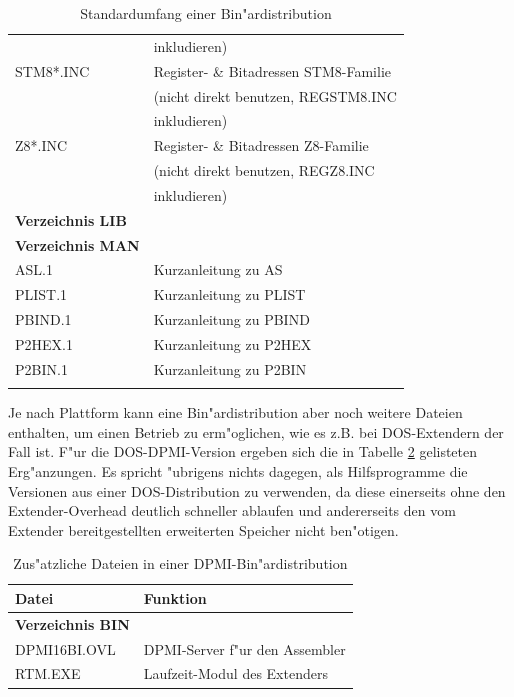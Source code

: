 \documentclass[12pt,a4paper,twoside]{report}
\begin{document}
\begin{center}
\begin{longtable}{|l|l|}
                  & inkludieren) \\
STM8\/*.INC       & Register- \& Bitadressen STM8-Familie \\
                  & (nicht direkt benutzen, REGSTM8.INC \\
                  & inkludieren) \\
Z8\/*.INC         & Register- \& Bitadressen Z8-Familie \\
                  & (nicht direkt benutzen, REGZ8.INC \\
                  & inkludieren) \\
\hline
{\bf Verzeichnis LIB} & \\
\hline
{\bf Verzeichnis MAN} & \\
\hline
ASL.1             & Kurzanleitung zu AS \\
PLIST.1           & Kurzanleitung zu PLIST \\
PBIND.1           & Kurzanleitung zu PBIND \\
P2HEX.1           & Kurzanleitung zu P2HEX \\
P2BIN.1           & Kurzanleitung zu P2BIN \\
\hline
\caption{Standardumfang einer Bin"ardistribution
 \label{TabCommonPackageList}}
\end{longtable}\end{center}

Je nach Plattform kann eine Bin"ardistribution aber noch weitere Dateien
enthalten, um einen Betrieb zu erm"oglichen, wie es z.B. bei DOS-Extendern
der Fall ist.  F"ur die DOS-DPMI-Version  ergeben
sich die in Tabelle \ref{TabDPMIPackageList} gelisteten Erg"anzungen.  Es
spricht "ubrigens nichts dagegen, als Hilfsprogramme die Versionen aus
einer DOS-Distribution zu verwenden, da diese einerseits ohne den
Extender-Overhead deutlich schneller ablaufen und andererseits den
vom Extender bereitgestellten erweiterten Speicher nicht ben"otigen.

\begin{table}[htp]
\begin{center}\begin{tabular}{|l|l|}
\hline
Datei             & Funktion \\
\hline
\hline
{\bf Verzeichnis BIN} & \\
\hline
DPMI16BI.OVL   & DPMI-Server f"ur den Assembler \\
RTM.EXE        & Laufzeit-Modul des Extenders \\
\hline
\end{tabular}\end{center}
\caption{Zus"atzliche Dateien in einer DPMI-Bin"ardistribution
         \label{TabDPMIPackageList}}
\end{table}
\end{document}
